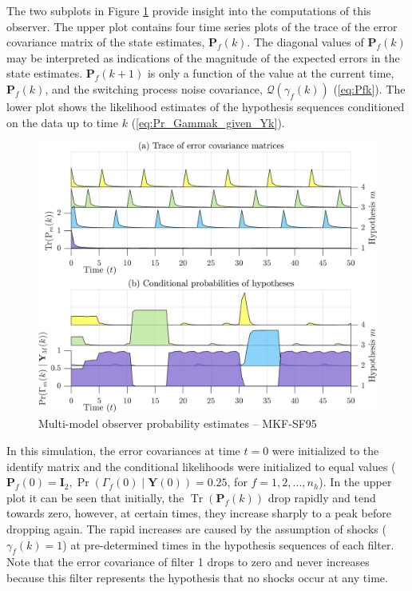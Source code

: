 The two subplots in Figure \ref{fig:rod-obs-sim-test-probs-SF95} provide insight into the computations of this observer. The upper plot contains four time series plots of the trace of the error covariance matrix of the state estimates, $\mathbf{P}_f(k)$. The diagonal values of $\mathbf{P}_f(k)$ may be interpreted as indications of the magnitude of the expected errors in the state estimates. $\mathbf{P}_f(k+1)$ is only a function of the value at the current time, $\mathbf{P}_f(k)$, and the switching process noise covariance, $\mathcal{Q}(\gamma_f(k))$ (\ref{eq:Pfk}). The lower plot shows the likelihood estimates of the hypothesis sequences conditioned on the data up to time $k$ (\ref{eq:Pr_Gammak_given_Yk}).
\begin{figure}[htp]
	\centering
	\includegraphics[width=14cm]{images/rod_MKF_test_sim_MKF_SF95_prob.png}
	\caption{Multi-model observer probability estimates – MKF-SF95}
	\label{fig:rod-obs-sim-test-probs-SF95}
\end{figure}

In this simulation, the error covariances at time $t=0$ were initialized to the identify matrix and the conditional likelihoods were initialized to equal values ($\mathbf{P}_f(0)=\mathbf{I}_2,\operatorname{Pr}\left(\Gamma_f(0) \mid \mathbf{Y}(0)\right)=0.25$, for $f=1,2,...,n_h$). In the upper plot it can be seen that initially, the $\operatorname{Tr}(\mathbf{P}_f(k))$ drop rapidly and tend towards zero, however, at certain times, they increase sharply to a peak before dropping again. The rapid increases are caused by the assumption of shocks ($\gamma_f(k)=1$) at pre-determined times in the hypothesis sequences of each filter. Note that the error covariance of filter 1 drops to zero and never increases because this filter represents the hypothesis that no shocks occur at any time.


